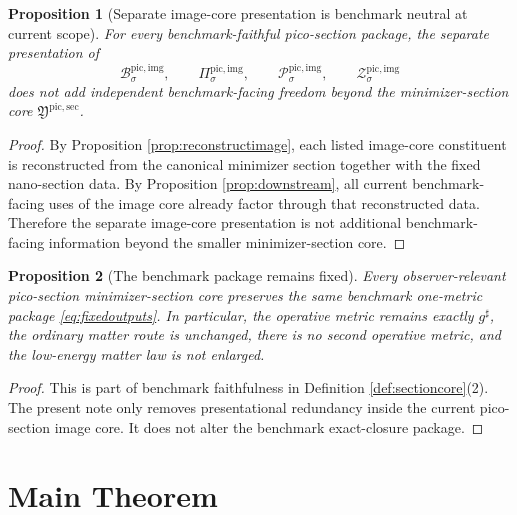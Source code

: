\documentclass[11pt]{article}
\newcommand{\CompletedMetric}{g^{\sharp}}
\newcommand{\PicoImgBody}[1]{\mathcal B_{#1}^{\mathrm{pic,img}}}
\newcommand{\PicoImgProj}[1]{\Pi_{#1}^{\mathrm{pic,img}}}
\newcommand{\PicoImgFunctional}[1]{\mathscr P_{#1}^{\mathrm{pic,img}}}
\newcommand{\PicoImgShell}[1]{\mathcal Z_{#1}^{\mathrm{pic,img}}}
\newcommand{\PicoMinSectionCore}{\mathfrak Y^{\mathrm{pic,sec}}}
\newtheorem{proposition}{Proposition}
\begin{document}
\begin{proposition}[Separate image-core presentation is benchmark neutral at current scope]
\label{prop:neutral}
For every benchmark-faithful pico-section package, the separate presentation of
\[
\PicoImgBody{\sigma},
\qquad
\PicoImgProj{\sigma},
\qquad
\PicoImgFunctional{\sigma},
\qquad
\PicoImgShell{\sigma}
\]
does not add independent benchmark-facing freedom beyond the minimizer-section core \(\PicoMinSectionCore\).
\end{proposition}

\begin{proof}
By Proposition \ref{prop:reconstructimage}, each listed image-core constituent is reconstructed from the canonical minimizer section together with the fixed nano-section data. By Proposition \ref{prop:downstream}, all current benchmark-facing uses of the image core already factor through that reconstructed data. Therefore the separate image-core presentation is not additional benchmark-facing information beyond the smaller minimizer-section core.
\end{proof}

\begin{proposition}[The benchmark package remains fixed]
\label{prop:benchmark}
Every observer-relevant pico-section minimizer-section core preserves the same benchmark one-metric package \eqref{eq:fixedoutputs}. In particular, the operative metric remains exactly \(\CompletedMetric\), the ordinary matter route is unchanged, there is no second operative metric, and the low-energy matter law is not enlarged.
\end{proposition}

\begin{proof}
This is part of benchmark faithfulness in Definition \ref{def:sectioncore}(2). The present note only removes presentational redundancy inside the current pico-section image core. It does not alter the benchmark exact-closure package.
\end{proof}

\section{Main Theorem}
\end{document}
